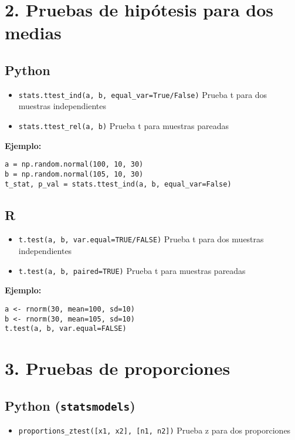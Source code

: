\section*{2. Pruebas de hipótesis para dos medias}

\subsection*{Python}
\begin{itemize}
    \item \texttt{stats.ttest\_ind(a, b, equal\_var=True/False)} \hfill Prueba t para dos muestras independientes
    \item \texttt{stats.ttest\_rel(a, b)} \hfill Prueba t para muestras pareadas
\end{itemize}

\textbf{Ejemplo:}
\begin{verbatim}
a = np.random.normal(100, 10, 30)
b = np.random.normal(105, 10, 30)
t_stat, p_val = stats.ttest_ind(a, b, equal_var=False)
\end{verbatim}

\subsection*{R}
\begin{itemize}
    \item \texttt{t.test(a, b, var.equal=TRUE/FALSE)} \hfill Prueba t para dos muestras independientes
    \item \texttt{t.test(a, b, paired=TRUE)} \hfill Prueba t para muestras pareadas
\end{itemize}

\textbf{Ejemplo:}
\begin{verbatim}
a <- rnorm(30, mean=100, sd=10)
b <- rnorm(30, mean=105, sd=10)
t.test(a, b, var.equal=FALSE)
\end{verbatim}

\section*{3. Pruebas de proporciones}

\subsection*{Python (\texttt{statsmodels})}
\begin{itemize}
    \item \texttt{proportions\_ztest([x1, x2], [n1, n2])} \hfill Prueba z para dos proporciones
\end{itemize}


